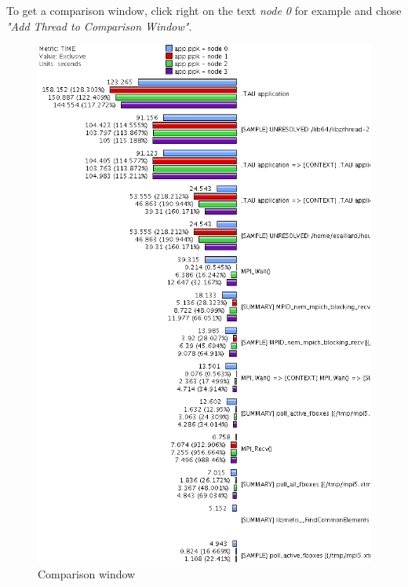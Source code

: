 \documentclass[10pt,twoside]{article}   	%
\begin{document}
To get a comparison window, click right on the text \textit{node 0} for example and chose \textit{"Add Thread to Comparison Window"}.

\begin{figure}[H]
\includegraphics[width=14cm]{IMAGES/ScreenShot3}
\caption{Comparison window}
\label{fig:3}
\end{figure}


 \\
\end{document}
